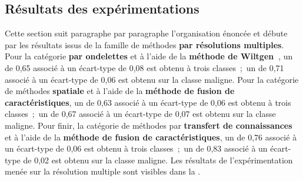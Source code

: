 \subsection{Résultats des expérimentations}
Cette section suit paragraphe par paragraphe l'organisation énoncée et débute par les résultats issus de la famille de méthodes \textbf{par résolutions multiples}. Pour la catégorie \textbf{par ondelettes} et à l'aide de la \textbf{méthode de Wiltgen~}, un \fscore{} de 0,65 associé à un écart-type de 0,08 est obtenu à trois classes~;~un \fscore{} de 0,71 associé à un écart-type de 0,06 est obtenu sur la classe maligne. Pour la catégorie de méthodes \textbf{spatiale} et à l'aide de la \textbf{méthode de fusion de caractéristiques}, un \fscore{} de 0,63 associé à un écart-type de 0,06 est obtenu à trois classes~;~un \fscore{} de 0,67 associé à un écart-type de 0,07 est obtenu sur la classe maligne. Pour finir, la catégorie de méthodes par \textbf{transfert de connaissances} et à l'aide de la \textbf{méthode de fusion de caractéristiques}, un \fscore{} de 0,76 associé à un écart-type de 0,06 est obtenu à trois classes~;~un \fscore{} de 0,83 associé à un écart-type de 0,02 est obtenu sur la classe maligne. Les résultats de l'expérimentation menée sur la résolution multiple sont visibles dans la .\par

